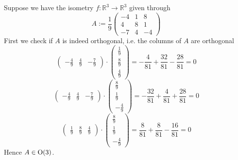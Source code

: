 \begin{example}
   Suppose we have the isometry \(f: \mathbb{R}^3 \to \mathbb{R}^3\) given through
   \[A := \frac{1}{9}\begin{pmatrix}-4&1&8\\4&8&1\\-7&4&-4\end{pmatrix}\]
   First we check if \(A\) is indeed orthogonal, i.e. the columns of \(A\) are orthogonal
   \[\begin{pmatrix}-\frac{4}{9}&\frac{4}{9}&-\frac{7}{9}\end{pmatrix} \cdot \begin{pmatrix}\frac{1}{9}\\\frac{8}{9}\\\frac{4}{9}\end{pmatrix} = -\frac{4}{81} + \frac{32}{81} - \frac{28}{81} = 0\]
   \[\begin{pmatrix}-\frac{4}{9}&\frac{4}{9}&-\frac{7}{9}\end{pmatrix} \cdot \begin{pmatrix}\frac{8}{9}\\\frac{1}{9}\\-\frac{4}{9}\end{pmatrix} = -\frac{32}{81} + \frac{4}{81} + \frac{28}{81} = 0\]
   \[\begin{pmatrix}\frac{1}{9}&\frac{8}{9}&\frac{4}{9}\end{pmatrix} \cdot \begin{pmatrix}\frac{8}{9}\\\frac{1}{9}\\-\frac{4}{9}\end{pmatrix} = \frac{8}{81} + \frac{8}{81} - \frac{16}{81} = 0\]
   Hence \(A \in \operatorname{O}(3)\).


\end{example}
